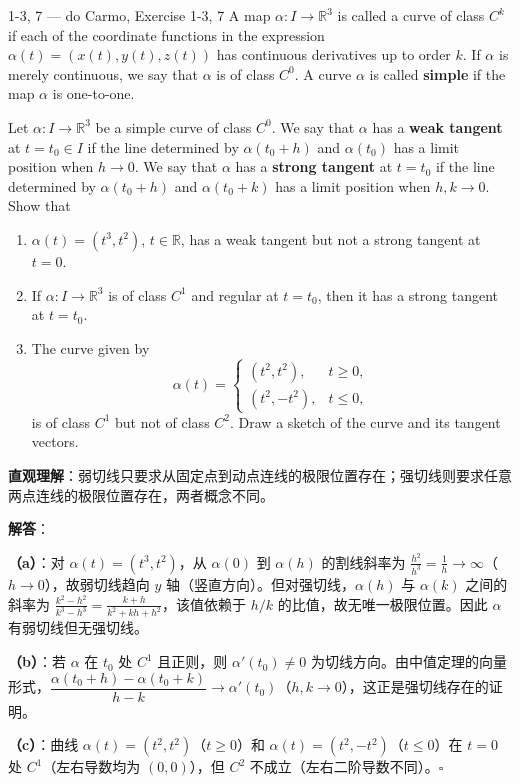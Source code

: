 \begin{exercise}{1-3, 7 — do Carmo, Exercise 1-3, 7}
A map $\alpha: I \to \mathbb{R}^3$ is called a curve of class $C^k$ if each of the coordinate functions in the expression $\alpha(t) = (x(t), y(t), z(t))$ has continuous derivatives up to order $k$. If $\alpha$ is merely continuous, we say that $\alpha$ is of class $C^0$. A curve $\alpha$ is called \textbf{simple} if the map $\alpha$ is one-to-one.

Let $\alpha: I \to \mathbb{R}^3$ be a simple curve of class $C^0$. We say that $\alpha$ has a \textbf{weak tangent} at $t = t_0 \in I$ if the line determined by $\alpha(t_0 + h)$ and $\alpha(t_0)$ has a limit position when $h \to 0$. We say that $\alpha$ has a \textbf{strong tangent} at $t = t_0$ if the line determined by $\alpha(t_0 + h)$ and $\alpha(t_0 + k)$ has a limit position when $h, k \to 0$. Show that
\begin{enumerate}
\item[a.] $\alpha(t) = (t^3, t^2)$, $t \in \mathbb{R}$, has a weak tangent but not a strong tangent at $t = 0$.
\item[b.] If $\alpha: I \to \mathbb{R}^3$ is of class $C^1$ and regular at $t = t_0$, then it has a strong tangent at $t = t_0$.
\item[c.] The curve given by
\[
\alpha(t) = \begin{cases} (t^2, t^2), & t \geq 0, \\ (t^2, -t^2), & t \leq 0, \end{cases}
\]
is of class $C^1$ but not of class $C^2$. Draw a sketch of the curve and its tangent vectors.
\end{enumerate}
\end{exercise}

\begin{solution}
\textbf{直观理解}：弱切线只要求从固定点到动点连线的极限位置存在；强切线则要求任意两点连线的极限位置存在，两者概念不同。

\textbf{解答}：

\textbf{（a）}：对 $\alpha(t) = (t^3, t^2)$，从 $\alpha(0)$ 到 $\alpha(h)$ 的割线斜率为 $\frac{h^2}{h^3} = \frac{1}{h} \to \infty$（$h \to 0$），故弱切线趋向 $y$ 轴（竖直方向）。但对强切线，$\alpha(h)$ 与 $\alpha(k)$ 之间的斜率为 $\frac{k^2 - h^2}{k^3 - h^3} = \frac{k+h}{k^2 + kh + h^2}$，该值依赖于 $h/k$ 的比值，故无唯一极限位置。因此 $\alpha$ 有弱切线但无强切线。

\textbf{（b）}：若 $\alpha$ 在 $t_0$ 处 $C^1$ 且正则，则 $\alpha'(t_0) \neq 0$ 为切线方向。由中值定理的向量形式，$\dfrac{\alpha(t_0+h)-\alpha(t_0+k)}{h-k} \to \alpha'(t_0)$（$h,k\to 0$），这正是强切线存在的证明。

\textbf{（c）}：曲线 $\alpha(t) = (t^2, t^2)$（$t \geq 0$）和 $\alpha(t) = (t^2, -t^2)$（$t \leq 0$）在 $t=0$ 处 $C^1$（左右导数均为 $(0,0)$），但 $C^2$ 不成立（左右二阶导数不同）。$\square$
\end{solution}

